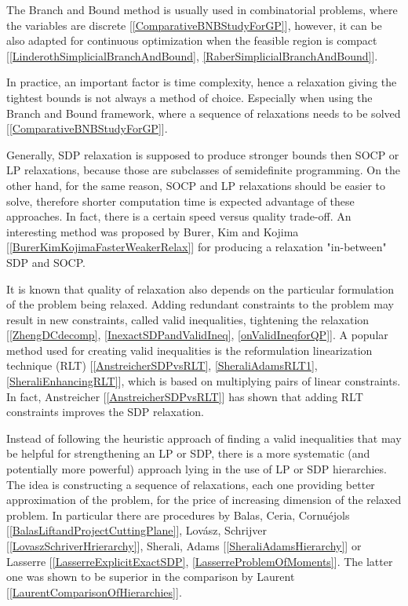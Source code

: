 \documentclass[12pt]{book}
\theoremstyle{definition}
\begin{document}
The Branch and Bound method is usually used in combinatorial problems, where the variables are discrete [\ref{ComparativeBNBStudyForGP}], however, it can be also adapted for continuous optimization when the feasible region is compact [\ref{LinderothSimplicialBranchAndBound}, \ref{RaberSimplicialBranchAndBound}].

In practice, an important factor is time complexity, hence a relaxation giving the tightest bounds is not always a method of choice. Especially when using the Branch and Bound framework, where a sequence of relaxations needs to be solved [\ref{ComparativeBNBStudyForGP}].

Generally, SDP relaxation is supposed to produce stronger bounds then SOCP or LP relaxations, because those are subclasses of semidefinite programming. On the other hand, for the same reason, SOCP and LP relaxations should be easier to solve, therefore shorter computation time is expected advantage of these approaches. In fact, there is a certain speed versus quality trade-off. 
An interesting method was proposed by Burer, Kim and Kojima [\ref{BurerKimKojimaFasterWeakerRelax}] for producing a relaxation "in-between" SDP and SOCP. 


It is known that quality of relaxation also depends on the particular formulation of the problem being relaxed. Adding redundant constraints to the problem may result in new constraints, called valid inequalities, tightening the relaxation [\ref{ZhengDCdecomp}, \ref{InexactSDPandValidIneq}, \ref{onValidIneqforQP}]. A popular method used for creating valid inequalities is the reformulation linearization technique (RLT) [\ref{AnstreicherSDPvsRLT}, \ref{SheraliAdamsRLT1}, \ref{SheraliEnhancingRLT}], which is based on multiplying pairs of linear constraints. In fact, Anstreicher [\ref{AnstreicherSDPvsRLT}] has shown that adding RLT constraints improves the SDP relaxation.

Instead of following the heuristic approach of finding a valid inequalities that may be helpful
for strengthening an LP or SDP, there is a more systematic (and potentially more powerful) approach
lying in the use of LP or SDP hierarchies. The idea is constructing a sequence of relaxations, each one providing better approximation of the problem, for the price of increasing dimension of the relaxed problem.
In particular there are procedures
by Balas, Ceria, Cornuéjols [\ref{BalasLiftandProjectCuttingPlane}], Lovász, Schrijver [\ref{LovaszSchriverHrierarchy}],  Sherali, Adams [\ref{SheraliAdamsHierarchy}] or Lasserre [\ref{LasserreExplicitExactSDP}, \ref{LasserreProblemOfMoments}]. The latter one was shown to be superior in the comparison by Laurent [\ref{LaurentComparisonOfHierarchies}].
\end{document}
